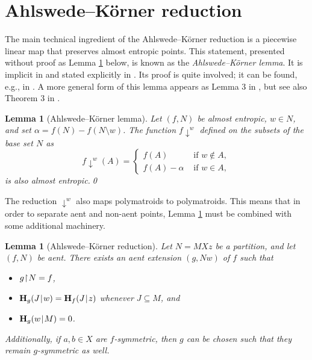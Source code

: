\documentclass[a4paper]{IEEEtran}
\def\|{\mskip1.5mu{|}\mskip1.5mu}
\def\H{\mathbf H}
\newcommand\restr{\mkern1mu{\upharpoonright}\mkern1mu}
\newcommand\dn{{\downarrow}}
\newtheorem{lemma}[theorem]{Lemma}
\theoremstyle{definition}
\begin{document}

\section{Ahlswede--K\"orner reduction}\label{sec:AK}

The main technical ingredient of the Ahlswede--K\"orner reduction is a
piecewise linear map that preserves almost entropic points. This statement,
presented without proof as Lemma \ref{lemma:down} below, is known as
the \emph{Ahlswede--K\"orner lemma}. It is implicit in \cite{AK}
and stated explicitly in \cite{Kaced}. Its proof is quite involved; it can
be found, e.g., in \cite[Lemma 5]{MMRV}. A more general form of this lemma
appears as Lemma 3 in \cite{entreg}, but see also Theorem 3 in \cite{fmtwocon}.

\begin{lemma}[Ahlswede--K\"orner lemma]\label{lemma:down}
Let $(f,N)$ be almost entropic, $w\in N$, and set $\alpha=f(N)-f(N\setminus w)$.
The function $f\dn^w$ defined on the subsets of the base set $N$ as
$$
    f\dn^w (A) = \begin{cases}
       f(A) & \mbox{ if $w\notin A$}, \\
       f(A)-\alpha & \mbox{ if $w\in A$},
    \end{cases}
$$
is also almost entropic.\qed
\end{lemma}

The reduction $\dn^w$ also maps polymatroids to polymatroids. This means
that in order to separate aent and non-aent points, Lemma \ref{lemma:down}
must be combined with some additional machinery.

\begin{lemma}[Ahlswede--K\"orner reduction]\label{lemma:AK}
Let $N=MXz$ be a partition, and let $(f,N)$ be aent. There exists an 
aent extension $(g,Nw)$ of $f$ such that
\begin{itemize}
\item[a)] $g\restr N = f$,
\item[b)] $\H_g(J\|w)=\H_f(J\|z)$ whenever $J\subseteq M$, and
\item[c)] $\H_g(w\|M)=0$.
\end{itemize}
Additionally, if $a,b\in X$ are $f$-symmetric, then $g$ can be chosen 
such that they remain $g$-symmetric as well.
\end{lemma}
\end{document}
